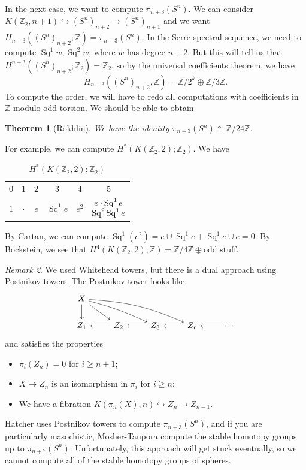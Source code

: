 \documentclass[leqno, openany]{memoir}
\newtheorem{thm}{Theorem}[section]
\theoremstyle{definition}
\theoremstyle{remark}
\newtheorem{rmk}[thm]{Remark}
\theoremstyle{plain}
\theoremstyle{definition}
\theoremstyle{remark}
\newcommand{\Z}{\mathbb{Z}}
\DeclareMathOperator{\Sq}{Sq}
\begin{document}
In the next case, we want to compute $\pi_{n+3}(S^n)$. We can consider $K(\Z_2, n+1) \hookrightarrow {(S^n)}_{n+2} \to {(S^n)}_{n+1}$ and we want $H_{n+3}({(S^n)}_{n+2}; \Z) = \pi_{n+3}(S^n)$. In the Serre spectral sequence, we need to compute $\Sq^1 w, \Sq^2 w$, where $w$ has degree $n+2$. But this will tell us that $H^{n+3}({(S^n)}_{n+2}; \Z_2) = \Z_2$, so by the universal coefficients theorem, we have
\[ H_{n+3}({(S^n)}_{n+2}, \Z) = \Z/2^k \oplus \Z/3\Z. \]
To compute the order, we will have to redo all computations with coefficients in $\Z$ modulo odd torsion. We should be able to obtain
\begin{thm}[Rokhlin]
    We have the identity $\pi_{n+3}(S^n) \cong \Z/24 \Z$.
\end{thm}
For example, we can compute $H^*(K(\Z_2, 2); \Z_2)$. We have
\begin{table}[H]
    \centering
    \caption{$H^*(K(\Z_2, 2); \Z_2)$}
    \label{tab:cohomology-k-z2-2}
    \begin{tabular}{cccccc}
    \toprule
    $0$ & $1$ & $2$ & $3$ & $4$ & $5$ \\
    $1$ & $\cdot$ & $e$ & $\Sq^1 e$ & $e^2$ & $\Vectorstack{{e \cdot \Sq^1 e} {\Sq^2 \Sq^1 e}}$ \\
    \bottomrule
    \end{tabular}
\end{table}
By Cartan, we can compute $\Sq^1(e^2) = e \cup \Sq^1 e + \Sq^1 e \cup e = 0$. By Bockstein, we see that $H^4(K(\Z_2, 2); \Z) = \Z/4\Z \oplus \text{odd stuff}$.

\begin{rmk}
    We used Whitehead towers, but there is a dual approach using Postnikov towers. The Postnikov tower looks like
    \begin{equation*}
    \begin{tikzcd}
        X \ar{d} \ar{dr} \ar[bend left=5]{drr} \ar[bend left=10]{drrr} \\
        Z_1 & Z_2 \ar{l} & Z_3 \ar{l} & Z_r \ar{l} & \cdots \ar{l}
    \end{tikzcd}
    \end{equation*}
    and satisfies the properties
    \begin{itemize}
        \item $\pi_i(Z_n) = 0$ for $i \geq n+1$;
        \item $X \to Z_n$ is an isomorphism in $\pi_i$ for $i \geq n$;
        \item We have a fibration $K(\pi_n(X), n) \hookrightarrow Z_n \to Z_{n-1}$.
    \end{itemize}
\end{rmk}
Hatcher uses Postnikov towers to compute $\pi_{n+3}(S^n)$, and if you are particularly masochistic, Mosher-Tanpora compute the stable homotopy groups up to $\pi_{n+7}(S^n)$. Unfortunately, this approach will get stuck eventually, so we cannot compute all of the stable homotopy groups of spheres.
\end{document}
